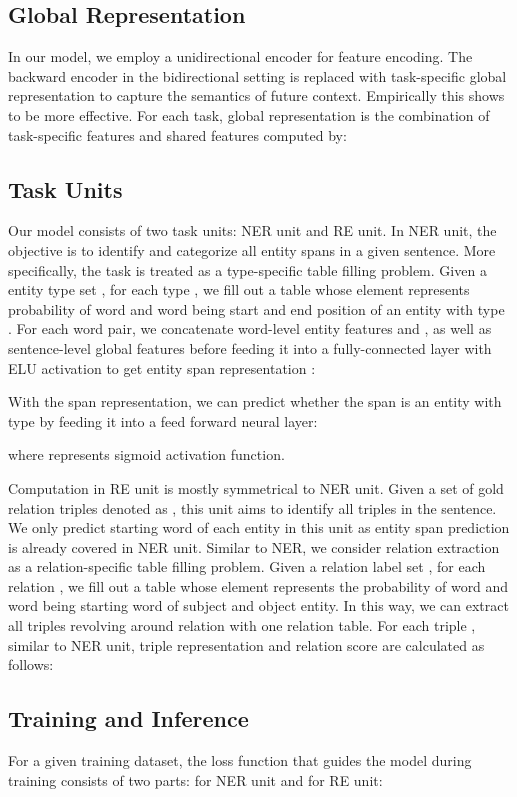 \documentclass[11pt]{article}
\begin{document}
\subsection{Global Representation} In our model, we employ a unidirectional encoder for feature encoding. The backward encoder in the bidirectional setting is replaced with task-specific global representation to capture the semantics of future context. Empirically this shows to be more effective. For each task, global representation is the combination of task-specific features and shared features computed by:    



\subsection{Task Units}
Our model consists of two task units: NER unit and RE unit. In NER unit, the objective is to identify and categorize all entity spans in a given sentence. More specifically, the task is treated as a type-specific table filling problem. Given a entity type set , for each type , we fill out a table whose element  represents probability of word  and word  being start and end position of an entity with type .  For each word pair, we concatenate word-level entity features  and , as well as sentence-level global features  before feeding it into a fully-connected layer with ELU activation to get entity span representation :

With the span representation, we can predict whether the span is an entity with type  by feeding it into a feed forward neural layer:

where  represents sigmoid activation function.

Computation in RE unit is mostly symmetrical to NER unit. Given a set of gold relation triples denoted as , this unit aims to identify all triples in the sentence. We only predict starting word of each entity in this unit as entity span prediction is already covered in NER unit. Similar to NER, we consider relation extraction as a relation-specific table filling problem. Given a relation label set , for each relation , we fill out a table whose element  represents the probability of word  and word  being starting word of subject and object entity. In this way, we can extract all triples revolving around relation  with one relation table. For each triple , similar to NER unit, triple representation  and relation score  are calculated as follows:


\subsection{Training and Inference}
For a given training dataset, the loss function that guides the model during training consists of two parts: for NER unit and  for RE unit:
 
\end{document}
